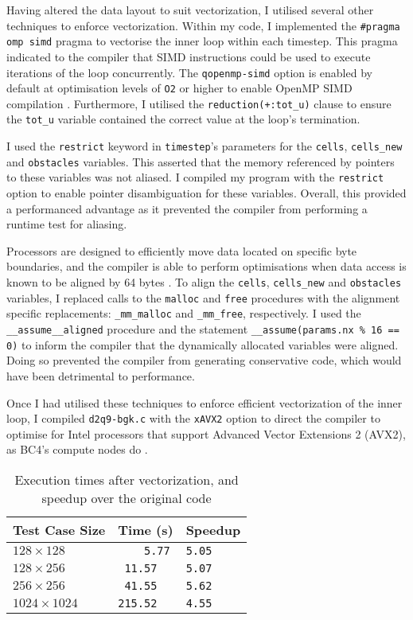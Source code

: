 \documentclass[11pt, twocolumn, a4paper]{article}
\begin{document}
Having altered the data layout to suit vectorization, I utilised several other techniques to enforce vectorization.
Within my code, I implemented the \texttt{\#pragma omp simd} pragma to vectorise the inner loop within each timestep.
This pragma indicated to the compiler that SIMD instructions could be used to execute iterations of the loop concurrently.
The \texttt{qopenmp-simd} option is enabled by default at optimisation levels of \texttt{O2} or higher to enable OpenMP SIMD compilation \cite{icc}.
Furthermore, I utilised the \texttt{reduction(+:tot\_u)} clause to ensure the \texttt{tot\_u} variable contained the correct value at the loop's termination.

I used the \texttt{restrict} keyword in \texttt{timestep}'s parameters for the \texttt{cells}, \texttt{cells\_new} and \texttt{obstacles} variables.
This asserted that the memory referenced by pointers to these variables was not aliased.
I compiled my program with the \texttt{restrict} option to enable pointer disambiguation for these variables.
Overall, this provided a performanced advantage as it prevented the compiler from performing a runtime test for aliasing.

Processors are designed to efficiently move data located on specific byte boundaries, and the compiler is able to perform optimisations when data access is known to be aligned by 64 bytes \cite{alignment}.
To align the \texttt{cells}, \texttt{cells\_new} and \texttt{obstacles} variables, I replaced calls to the \texttt{malloc} and \texttt{free} procedures with the alignment specific replacements: \texttt{\_mm\_malloc} and \texttt{\_mm\_free}, respectively.
I used the \texttt{\_\_assume\_\_aligned} procedure and  the statement \texttt{\_\_assume(params.nx \% 16 == 0)} to inform the compiler that the dynamically allocated variables were aligned.
Doing so prevented the compiler from generating conservative code, which would have been detrimental to performance.

Once I had utilised these techniques to enforce efficient vectorization of the inner loop, I compiled \texttt{d2q9-bgk.c} with the \texttt{xAVX2} option to direct the compiler to optimise for Intel processors that support Advanced Vector Extensions 2 (AVX2), as BC4's compute nodes do \cite{lenovo}.

\begin{table}[htbp]
  \begin{center}
  \caption{Execution times after vectorization, and speedup over the original code}\label{tab:vectorized}
  \begin{tabular}{l | l l} 
      \hline\hline
      Test Case Size&Time (s)&Speedup\\
      \hline
      $128 \times 128$&\texttt{  \,\,\,5.77}&\texttt{5.05}\\
      $128 \times 256$&\texttt{ 11.57}&\texttt{5.07}\\
      $256 \times 256$&\texttt{ 41.55}&\texttt{5.62}\\
      $1024 \times 1024$&\texttt{215.52}&\texttt{4.55}\\
      \hline
    \end{tabular}
  \end{center}
\end{table}
\end{document}
